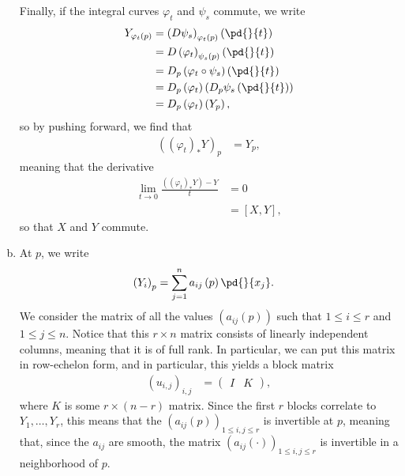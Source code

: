 \documentclass[10pt]{mypackage}
\begin{document}
\begin{solution}
\begin{enumerate}[(a)]
      Finally, if the integral curves $\varphi_t$ and $\psi_s$ commute, we write
      \begin{align*}
        Y_{\varphi_t(p)} &= \left( D\psi_s \right)_{\varphi_t(p)}\left( \pd{}{t} \right)\\
                         &= D\left( \varphi_t \right)_{\psi_s(p)}\left( \pd{}{t} \right)\\
                         &= D_{p}\left( \varphi_t\circ \psi_s \right)\left( \pd{}{t} \right)\\
                         &= D_{p}\left( \varphi_t \right)\left( D_{p}\psi_s\left( \pd{}{t} \right) \right)\\
                         &= D_p\left( \varphi_t \right)\left( Y_{p} \right),
      \end{align*}
      so by pushing forward, we find that
      \begin{align*}
        \left( \left( \varphi_t \right)_{\ast}Y \right)_{p} &= Y_p,
      \end{align*}
      meaning that the derivative
      \begin{align*}
        \lim_{t\rightarrow 0} \frac{\left( \left( \varphi_t \right)_{\ast}Y \right) - Y}{t} &= 0\\
                                                                                            &= \left[ X,Y \right],
      \end{align*}
      so that $X$ and $Y$ commute.
    \item At $p$, we write
      \begin{align*}
        \left( Y_i \right)_p &= \sum_{j=1}^{n} a_{ij}\left( p \right) \pd{}{x_j}.
      \end{align*}
      We consider the matrix of all the values $\left( a_{ij}(p) \right)$ such that $ 1\leq i \leq r $ and $1\leq j \leq n$. Notice that this $r\times n$ matrix consists of linearly independent columns, meaning that it is of full rank. In particular, we can put this matrix in row-echelon form, and in particular, this yields a block matrix
      \begin{align*}
        \left( u_{i,j} \right)_{i,j} &= \begin{pmatrix}I & K\end{pmatrix},
      \end{align*}
      where $K$ is some $r\times \left( n-r \right)$ matrix. Since the first $r$ blocks correlate to $Y_1,\dots,Y_r$, this means that the $\left( a_{ij}\left( p \right) \right)_{1\leq i,j\leq r}$ is invertible at $p$, meaning that, since the $a_{ij}$ are smooth, the matrix $\left( a_{ij}\left( \cdot \right) \right)_{1\leq i,j\leq r}$ is invertible in a neighborhood of $p$.

\end{enumerate}
\end{solution}
\end{document}
